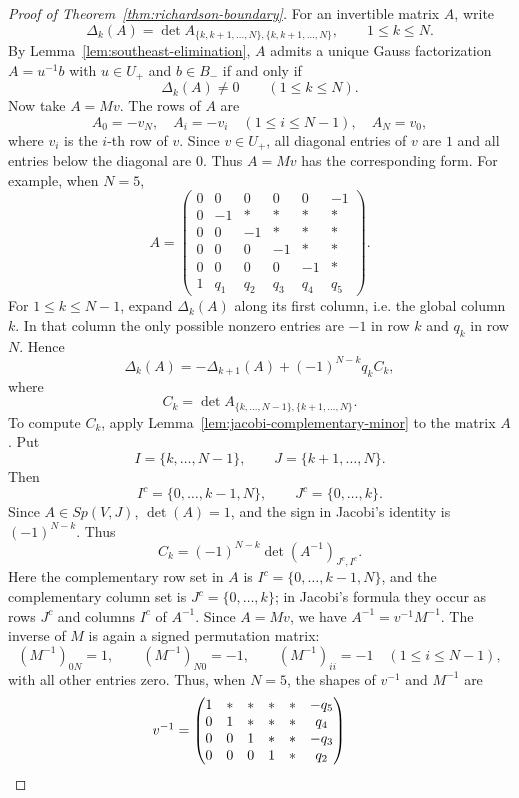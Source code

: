 \begin{proof}[Proof of Theorem~\ref{thm:richardson-boundary}]
For an invertible matrix \(A\), write
\[
\Delta_k(A)=
\det A_{\{k,k+1,\ldots,N\},\{k,k+1,\ldots,N\}},
\qquad
1\le k\le N.
\]
By Lemma~\ref{lem:southeast-elimination}, \(A\) admits a unique Gauss factorization \(A=u^{-1}b\) with \(u\in U_+\) and \(b\in B_-\) if and only if
\[
\Delta_k(A)\ne0\qquad(1\le k\le N).
\]
Now take \(A=Mv\). The rows of \(A\) are
\[ A_0=-v_N,
\quad
A_i=-v_i\quad(1\le i\le N-1),
\quad
A_N=v_0,
\]
where \(v_i\) is the \(i\)-th row of \(v\). Since \(v\in U_+\), all diagonal entries of \(v\) are \(1\) and all entries below the diagonal are \(0\). Thus \(A=Mv\) has the corresponding form. For example, when \(N=5\),
\[
A=
\begin{pmatrix}
0&0&0&0&0&-1\\
0&-1&*&*&*&*\\
0&0&-1&*&*&*\\
0&0&0&-1&*&*\\
0&0&0&0&-1&*\\
1&q_1&q_2&q_3&q_4&q_5
\end{pmatrix}.
\]
For \(1\le k\le N-1\), expand \(\Delta_k(A)\) along its first column, i.e. the global column \(k\). In that column the only possible nonzero entries are \(-1\) in row \(k\) and \(q_k\) in row \(N\). Hence
\[
\Delta_k(A)
=
-\Delta_{k+1}(A)
+(-1)^{N-k}q_kC_k,
\]
where
\[
C_k=
\det A_{\{k,\ldots,N-1\},\{k+1,\ldots,N\}}.
\]
To compute \(C_k\), apply Lemma~\ref{lem:jacobi-complementary-minor} to the matrix \(A\). Put
\[
I=\{k,\ldots,N-1\},
\qquad
J=\{k+1,\ldots,N\}.
\]
Then
\[
I^c=\{0,\ldots,k-1,N\},
\qquad
J^c=\{0,\ldots,k\}.
\]
Since \(A\in Sp(V,J)\), \(\det(A)=1\), and the sign in Jacobi's identity is \((-1)^{N-k}\). Thus
\[
C_k
=
(-1)^{N-k}
\det(A^{-1})_{J^c,I^c}.
\]
Here the complementary row set in \(A\) is \(I^c=\{0,\ldots,k-1,N\}\), and the complementary column set is \(J^c=\{0,\ldots,k\}\); in Jacobi's formula they occur as rows \(J^c\) and columns \(I^c\) of \(A^{-1}\). Since \(A=Mv\), we have \(A^{-1}=v^{-1}M^{-1}\). The inverse of \(M\) is again a signed permutation matrix:
\[
(M^{-1})_{0N}=1,
\qquad
(M^{-1})_{N0}=-1,
\qquad
(M^{-1})_{ii}=-1\quad(1\le i\le N-1),
\]
with all other entries zero. Thus, when \(N=5\), the shapes of \(v^{-1}\) and \(M^{-1}\) are
\[
\begin{array}{c@{\qquad}c}
v^{-1}=
\begin{pmatrix}
1&*&*&*&*&-q_5\\
0&1&*&*&*&q_4\\
0&0&1&*&*&-q_3\\
0&0&0&1&*&q_2\\

\end{pmatrix}
\end{array}\]
\end{proof}
